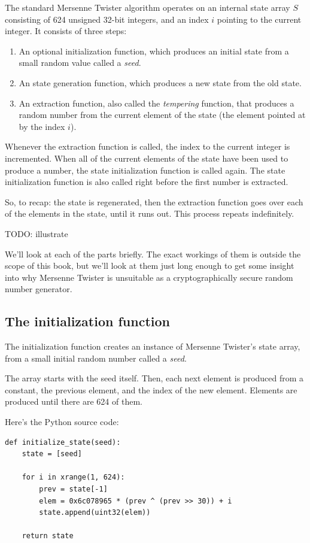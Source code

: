 \documentclass[11pt,ebook,table,dvipsnames]{memoir}
\begin{document}
The standard Mersenne Twister algorithm operates on an internal state
array $S$ consisting of 624 unsigned 32-bit integers, and an index $i$
pointing to the current integer. It consists of three steps:

\begin{enumerate}
\item An optional initialization function, which produces an initial
state from a small random value called a \emph{seed}.
\item An state generation function, which produces a new state from the
old state.
\item An extraction function, also called the \emph{tempering} function, that
produces a random number from the current element of the state (the
element pointed at by the index $i$).
\end{enumerate}

Whenever the extraction function is called, the index to the current
integer is incremented. When all of the current elements of the state
have been used to produce a number, the state initialization function
is called again. The state initialization function is also called
right before the first number is extracted.

So, to recap: the state is regenerated, then the extraction function
goes over each of the elements in the state, until it runs out. This
process repeats indefinitely.

TODO: illustrate

We'll look at each of the parts briefly. The exact workings of them is
outside the scope of this book, but we'll look at them just long
enough to get some insight into why Mersenne Twister is unsuitable as
a cryptographically secure random number generator.
\subsection{The initialization function}
\label{sec-2-10-6-2}

The initialization function creates an instance of Mersenne Twister's
state array, from a small initial random number called a \emph{seed}.

The array starts with the seed itself. Then, each next element is
produced from a constant, the previous element, and the index of the
new element. Elements are produced until there are 624 of them.

Here's the Python source code:

\begin{verbatim}
def initialize_state(seed):
    state = [seed]

    for i in xrange(1, 624):
        prev = state[-1]
        elem = 0x6c078965 * (prev ^ (prev >> 30)) + i
        state.append(uint32(elem))

    return state
\end{verbatim}
\end{document}
